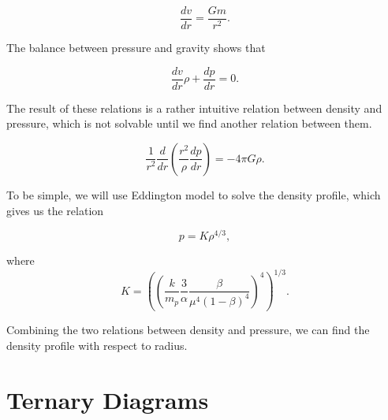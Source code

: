 \documentclass{tufte-handout}
\begin{document}
\begin{equation*}
    \frac{dv}{dr} = \frac{G m}{r^2}.
\end{equation*}

The balance between pressure and gravity shows that

\begin{equation*}
    \frac{dv}{dr} \rho + \frac{dp}{dr} = 0.
\end{equation*}

The result of these relations is a rather intuitive relation between density and pressure, which is not solvable until we find another relation between them.

\begin{equation*}
    \frac{1}{r^2} \frac{d}{dr} \left( \frac{r^2}{\rho} \frac{dp}{dr} \right) = -4\pi G\rho.
\end{equation*}

To be simple, we will use Eddington model to solve the density profile, which gives us the relation

\begin{equation*}
    p = K \rho^{4/3},
\end{equation*}


where 
\begin{equation*}
    K = \left(  \left( \frac{k}{m_p} \frac{3}{\alpha} \frac{\beta}{\mu^4(1-\beta)^4}  \right)^4  \right)^{1/3}.
\end{equation*}

Combining the two relations between density and pressure, we can find the density profile with respect to radius.







\section{Ternary Diagrams}
\end{document}
